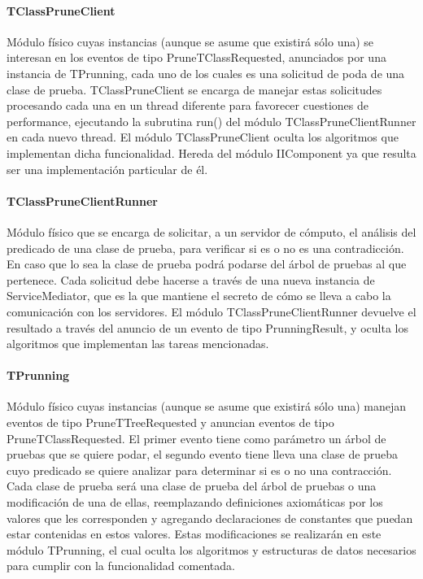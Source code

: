 \documentclass[a4paper,10pt]{report}
\begin{document}
				\paragraph{TClassPruneClient}
				Módulo físico cuyas instancias (aunque se asume que existirá sólo una) se interesan en los eventos de tipo PruneTClassRequested, anunciados por una instancia de TPrunning, cada uno de los cuales es una solicitud de poda de una clase de prueba. TClassPruneClient se encarga de manejar estas solicitudes procesando cada una en un thread diferente para favorecer cuestiones de performance, ejecutando la subrutina run() del módulo TClassPruneClientRunner en cada nuevo thread. El módulo TClassPruneClient oculta los algoritmos que implementan dicha funcionalidad. Hereda del módulo IIComponent ya que resulta ser una implementación particular de él.
				\paragraph{TClassPruneClientRunner}
				Módulo físico que se encarga de solicitar, a un servidor de cómputo, el análisis del predicado de una clase de prueba, para verificar si es o no es una contradicción. En caso que lo sea la clase de prueba podrá podarse del árbol de pruebas al que pertenece. Cada solicitud debe hacerse a través de una nueva instancia de ServiceMediator, que es la que mantiene el secreto de cómo se lleva a cabo la comunicación con los servidores. El módulo TClassPruneClientRunner devuelve el resultado a través del anuncio de un evento de tipo PrunningResult, y oculta los algoritmos que implementan las tareas mencionadas.
				\paragraph{TPrunning}
				Módulo físico cuyas instancias (aunque se asume que existirá sólo una) manejan eventos de tipo PruneTTreeRequested y anuncian eventos de tipo PruneTClassRequested. El primer evento tiene como parámetro un árbol de pruebas que se quiere podar, el segundo evento tiene lleva una clase de prueba cuyo predicado se quiere analizar para determinar si es o no una contracción. Cada clase de prueba será una clase de prueba del árbol de pruebas o una modificación de una de ellas, reemplazando definiciones axiomáticas por los valores que les corresponden y agregando declaraciones de constantes que puedan estar contenidas en estos valores. Estas modificaciones se realizarán en este módulo TPrunning, el cual oculta los algoritmos y estructuras de datos necesarios para cumplir con la funcionalidad comentada.
\end{document}
